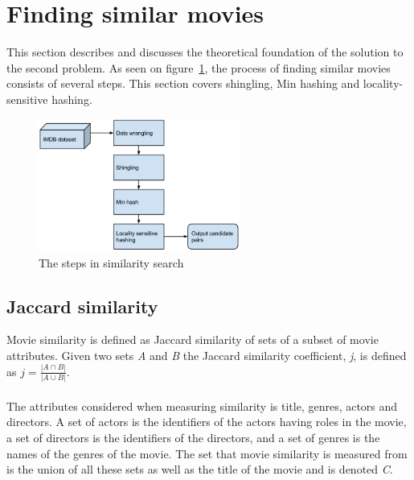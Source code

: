 
\section{Finding similar movies}

This section describes and discusses the theoretical foundation of the solution to the second problem. As seen on figure~\ref{fig:search_diagram}, the process of finding similar movies consists of several steps. This section covers shingling, Min hashing and locality-sensitive hashing.

\begin{figure}[H]
	\centering
	\includegraphics[width=250px]{img/Similaritysearchdiagram.png}
	\caption{The steps in similarity search} 
	\label{fig:search_diagram}
\end{figure}
\subsection{Jaccard similarity}
Movie similarity is defined as Jaccard similarity of sets of a subset of movie attributes. Given two sets \textit{A} and \textit{B} the Jaccard similarity coefficient, \textit{j}, is defined as \(j = \frac{|A \cap B|}{|A \cup B|}\). \\ \\
The attributes considered when measuring similarity is title, genres, actors and directors. A set of actors is the identifiers of the actors having roles in the movie, a set of directors is the identifiers of the directors, and a set of genres is the names of the genres of the movie. The set that movie similarity is measured from is the union of all these sets as well as the title of the movie and is denoted \textit{C}.

